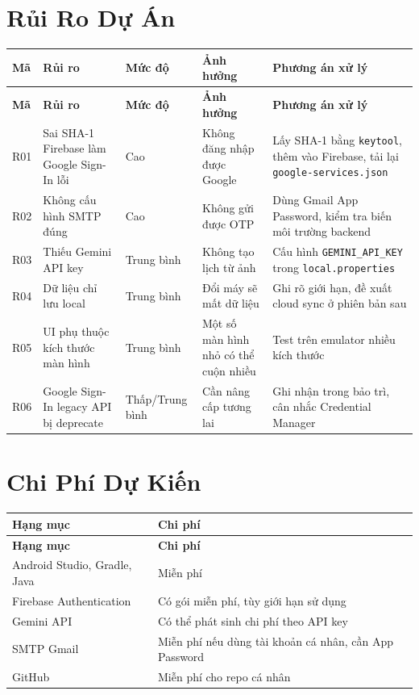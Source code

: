 \documentclass[12pt,a4paper]{report}
\begin{document}
\section{Rủi Ro Dự Án}

\begin{longtable}{|>{\raggedright\arraybackslash}p{}|>{\raggedright\arraybackslash}p{}|>{\raggedright\arraybackslash}p{}|>{\raggedright\arraybackslash}p{}|>{\raggedright\arraybackslash}p{}|}
\hline
\textbf{Mã} & \textbf{Rủi ro} & \textbf{Mức độ} & \textbf{Ảnh hưởng} & \textbf{Phương án xử lý} \\ \hline
\endfirsthead
\hline
\textbf{Mã} & \textbf{Rủi ro} & \textbf{Mức độ} & \textbf{Ảnh hưởng} & \textbf{Phương án xử lý} \\ \hline
\endhead
R01 & Sai SHA-1 Firebase làm Google Sign-In lỗi & Cao & Không đăng nhập được Google & Lấy SHA-1 bằng \texttt{keytool}, thêm vào Firebase, tải lại \texttt{google-services.json} \\ \hline
R02 & Không cấu hình SMTP đúng & Cao & Không gửi được OTP & Dùng Gmail App Password, kiểm tra biến môi trường backend \\ \hline
R03 & Thiếu Gemini API key & Trung bình & Không tạo lịch từ ảnh & Cấu hình \texttt{GEMINI\_API\_KEY} trong \texttt{local.properties} \\ \hline
R04 & Dữ liệu chỉ lưu local & Trung bình & Đổi máy sẽ mất dữ liệu & Ghi rõ giới hạn, đề xuất cloud sync ở phiên bản sau \\ \hline
R05 & UI phụ thuộc kích thước màn hình & Trung bình & Một số màn hình nhỏ có thể cuộn nhiều & Test trên emulator nhiều kích thước \\ \hline
R06 & Google Sign-In legacy API bị deprecate & Thấp/Trung bình & Cần nâng cấp tương lai & Ghi nhận trong bảo trì, cân nhắc Credential Manager \\ \hline
\end{longtable}

\section{Chi Phí Dự Kiến}

\begin{longtable}{|>{\raggedright\arraybackslash}p{}|>{\raggedright\arraybackslash}p{}|}
\hline
\textbf{Hạng mục} & \textbf{Chi phí} \\ \hline
\endfirsthead
\hline
\textbf{Hạng mục} & \textbf{Chi phí} \\ \hline
\endhead
Android Studio, Gradle, Java & Miễn phí \\ \hline
Firebase Authentication & Có gói miễn phí, tùy giới hạn sử dụng \\ \hline
Gemini API & Có thể phát sinh chi phí theo API key \\ \hline
SMTP Gmail & Miễn phí nếu dùng tài khoản cá nhân, cần App Password \\ \hline
GitHub & Miễn phí cho repo cá nhân \\ \hline
\end{longtable}
\end{document}
